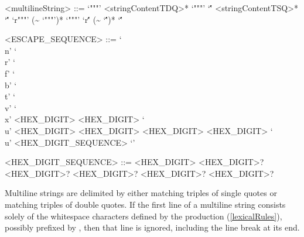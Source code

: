 \documentclass[makeidx]{article}
\begin{document}
{\begin{grammar}
<multilineString> ::= `"""' <stringContentTDQ>* `"""'
  \alt `\'\mbox\'\mbox\'' <stringContentTSQ>* `\'\mbox\'\mbox\''
  \alt `r"""' (\~{} `"""')* `"""'
  \alt `r\'\mbox\'\mbox\'' (\~{} `\'\mbox\'\mbox\'')* `\'\mbox\'\mbox\''

<ESCAPE\_SEQUENCE> ::= `\\n'
  \alt `\\r'
  \alt `\\f'
  \alt `\\b'
  \alt `\\t'
  \alt `\\v'
  \alt `\\x' <HEX\_DIGIT> <HEX\_DIGIT>
  \alt `\\u' <HEX\_DIGIT> <HEX\_DIGIT> <HEX\_DIGIT> <HEX\_DIGIT>
  \alt `\\u{' <HEX\_DIGIT\_SEQUENCE> `}'

<HEX\_DIGIT\_SEQUENCE> ::= \gnewline{}
  <HEX\_DIGIT> <HEX\_DIGIT>? <HEX\_DIGIT>?
  \gnewline{} <HEX\_DIGIT>? <HEX\_DIGIT>? <HEX\_DIGIT>?
\end{grammar}

\LMHash{}%
Multiline strings are delimited by either
matching triples of single quotes or
matching triples of double quotes.
If the first line of a multiline string consists solely of
the whitespace characters defined by the production 
(\ref{lexicalRules}),
possibly prefixed by ,
then that line is ignored,
including the line break at its end.



}
\end{document}

